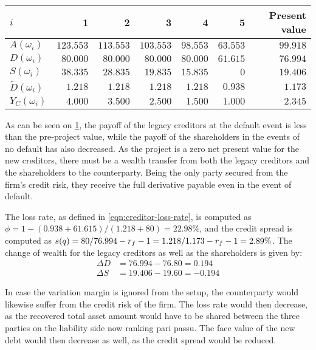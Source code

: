 \documentclass[../main.tex]{subfiles}
\begin{document}
        \begin{table}[H]
            \centering
            \begin{tabular}{l|rrrrr||r}
                $i$ & 1 & 2 & 3 & 4 & 5 & Present value \\
                \hline
                $A(\omega_{i})$ & $123.553$ & $113.553$ & $103.553$ & $98.553$ & $63.553$ & $99.918$ \\
                $D(\omega_{i})$ & $80.000$ & $80.000$ & $80.000$ & $80.000$ & $61.615$ & $76.994$ \\
                $S(\omega_{i})$ & $38.335$ & $28.835$ & $19.835$ & $15.835$ & $0$ & $19.406$ \\
                $\tilde{D}(\omega_{i})$ & $1.218$ & $1.218$ & $1.218$ & $1.218$ & $0.938$ & $1.173$ \\
                $Y_C(\omega_{i})$ & $4.000$ & $3.500$ & $2.500$ & $1.500$ & $1.000$ & $2.345$ \\
            \end{tabular}
            \caption{}
            \label{tbl:example-collateralized-derivative}
        \end{table}

        As can be seen on \cref{tbl:example-collateralized-derivative}, the payoff of the legacy creditors at the default event is less than the pre-project value, while the payoff of the shareholders in the events of no default has also decreased. As the project is a zero net present value for the new creditors, there must be a wealth transfer from both the legacy creditors and the shareholders to the counterparty. Being the only party secured from the firm's credit risk, they receive the full derivative payable even in the event of default.

        The loss rate, as defined in \cref{eqn:creditor-loss-rate}, is computed as
        $\phi = 1-(0.938+61.615)/(1.218+80) = 22.98\%$,
        and the credit spread is computed as
        $s(q) = 80/76.994 - r_{f} - 1 = 1.218/1.173 - r_{f} - 1 = 2.89\%$. The change of wealth for the legacy creditors as well as the shareholders is given by:
        \begin{align}
            \Delta D &= 76.994 - 76.80 = 0.194\\
            \Delta S &= 19.406 - 19.60 = -0.194
        \end{align}

        In case the variation margin is ignored from the setup, the counterparty would likewise suffer from the credit risk of the firm.
        The loss rate would then decrease,
        as the recovered total asset amount would have to be shared between the three parties on the liability side now ranking pari passu.
        The face value of the new debt would then decrease as well, as the credit spread would be reduced.
\end{document}
